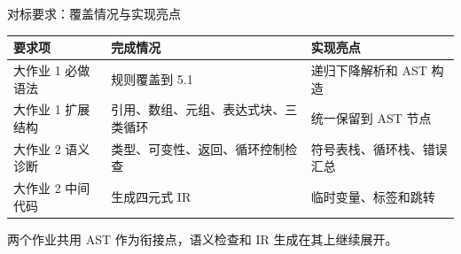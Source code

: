 \documentclass[aspectratio=169]{ctexbeamer}
\begin{document}
\begin{frame}{对标要求：覆盖情况与实现亮点}
    \begin{table}
    \centering
    \small
    \begin{tabular}{p{2.9cm}p{4.4cm}p{4.4cm}}
        \toprule
        \textbf{要求项} & \textbf{完成情况} & \textbf{实现亮点} \\
        \midrule
        大作业 1 必做语法 & 规则覆盖到 5.1 & 递归下降解析和 AST 构造 \\
        大作业 1 扩展结构 & 引用、数组、元组、表达式块、三类循环 & 统一保留到 AST 节点 \\
        大作业 2 语义诊断 & 类型、可变性、返回、循环控制检查 & 符号表栈、循环栈、错误汇总 \\
        大作业 2 中间代码 & 生成四元式 IR & 临时变量、标签和跳转 \\
        \bottomrule
    \end{tabular}
    \end{table}
    \vspace{0.2em}
    \centering
    两个作业共用 AST 作为衔接点，语义检查和 IR 生成在其上继续展开。
\end{frame}
\end{document}
